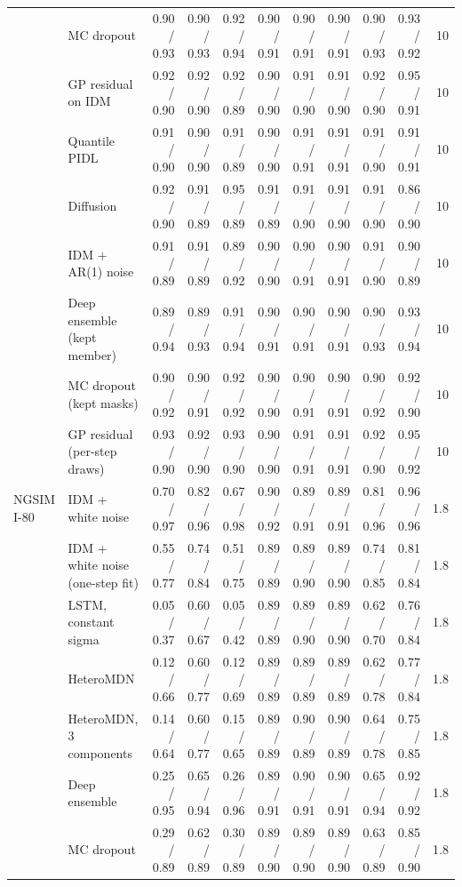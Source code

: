 \begin{longtable}{llrrrrrrrrr}
 & MC dropout & 0.90 / 0.93 & 0.90 / 0.93 & 0.92 / 0.94 & 0.90 / 0.91 & 0.90 / 0.91 & 0.90 / 0.91 & 0.90 / 0.93 & 0.93 / 0.92 & 10 \\
 & GP residual on IDM & 0.92 / 0.90 & 0.92 / 0.90 & 0.92 / 0.89 & 0.90 / 0.90 & 0.91 / 0.90 & 0.91 / 0.90 & 0.92 / 0.90 & 0.95 / 0.91 & 10 \\
 & Quantile PIDL & 0.91 / 0.90 & 0.90 / 0.90 & 0.91 / 0.89 & 0.90 / 0.90 & 0.91 / 0.91 & 0.91 / 0.91 & 0.91 / 0.90 & 0.91 / 0.91 & 10 \\
 & Diffusion & 0.92 / 0.90 & 0.91 / 0.89 & 0.95 / 0.89 & 0.91 / 0.89 & 0.91 / 0.90 & 0.91 / 0.90 & 0.91 / 0.90 & 0.86 / 0.90 & 10 \\
 & IDM + AR(1) noise & 0.91 / 0.89 & 0.91 / 0.89 & 0.89 / 0.92 & 0.90 / 0.90 & 0.90 / 0.91 & 0.90 / 0.91 & 0.91 / 0.90 & 0.90 / 0.89 & 10 \\
 & Deep ensemble (kept member) & 0.89 / 0.94 & 0.89 / 0.93 & 0.91 / 0.94 & 0.90 / 0.91 & 0.90 / 0.91 & 0.90 / 0.91 & 0.90 / 0.93 & 0.93 / 0.94 & 10 \\
 & MC dropout (kept masks) & 0.90 / 0.92 & 0.90 / 0.91 & 0.92 / 0.92 & 0.90 / 0.90 & 0.90 / 0.91 & 0.90 / 0.91 & 0.90 / 0.92 & 0.92 / 0.90 & 10 \\
 & GP residual (per-step draws) & 0.93 / 0.90 & 0.92 / 0.90 & 0.93 / 0.90 & 0.90 / 0.90 & 0.91 / 0.91 & 0.91 / 0.91 & 0.92 / 0.90 & 0.95 / 0.92 & 10 \\
\midrule
NGSIM I-80 & IDM + white noise & 0.70 / 0.97 & 0.82 / 0.96 & 0.67 / 0.98 & 0.90 / 0.92 & 0.89 / 0.91 & 0.89 / 0.91 & 0.81 / 0.96 & 0.96 / 0.96 & 1.8 \\
 & IDM + white noise (one-step fit) & 0.55 / 0.77 & 0.74 / 0.84 & 0.51 / 0.75 & 0.89 / 0.89 & 0.89 / 0.90 & 0.89 / 0.90 & 0.74 / 0.85 & 0.81 / 0.84 & 1.8 \\
 & LSTM, constant sigma & 0.05 / 0.37 & 0.60 / 0.67 & 0.05 / 0.42 & 0.89 / 0.89 & 0.89 / 0.90 & 0.89 / 0.90 & 0.62 / 0.70 & 0.76 / 0.84 & 1.8 \\
 & HeteroMDN & 0.12 / 0.66 & 0.60 / 0.77 & 0.12 / 0.69 & 0.89 / 0.89 & 0.89 / 0.89 & 0.89 / 0.89 & 0.62 / 0.78 & 0.77 / 0.84 & 1.8 \\
 & HeteroMDN, 3 components & 0.14 / 0.64 & 0.60 / 0.77 & 0.15 / 0.65 & 0.89 / 0.89 & 0.90 / 0.89 & 0.90 / 0.89 & 0.64 / 0.78 & 0.75 / 0.85 & 1.8 \\
 & Deep ensemble & 0.25 / 0.95 & 0.65 / 0.94 & 0.26 / 0.96 & 0.89 / 0.91 & 0.90 / 0.91 & 0.90 / 0.91 & 0.65 / 0.94 & 0.92 / 0.92 & 1.8 \\
 & MC dropout & 0.29 / 0.89 & 0.62 / 0.89 & 0.30 / 0.89 & 0.89 / 0.90 & 0.89 / 0.90 & 0.89 / 0.90 & 0.63 / 0.89 & 0.85 / 0.90 & 1.8 \\

\end{longtable}
